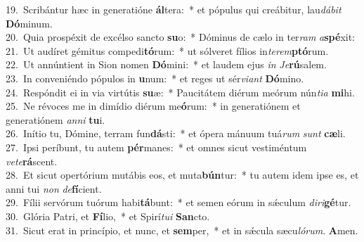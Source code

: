 {19.~}Scribántur hæc in generatióne \textbf{ál}tera:~* et pópulus qui creábitur, lau\textit{dá}\textit{bit} \textbf{Dó}minum.\\
{20.~}Quia prospéxit de excélso sancto \textbf{su}o:~* Dóminus de cælo in ter\textit{ram} \textit{a}\textbf{spé}xit:\\
{21.~}Ut audíret gémitus compedi\textbf{tó}rum:~* ut sólveret fílios in\textit{te}\textit{rem}\textbf{ptó}rum.\\
{22.~}Ut annúntient in Sion nomen \textbf{Dó}mini:~* et laudem ejus \textit{in} \textit{Je}\textbf{rú}salem.\\
{23.~}In conveniéndo pópulos in \textbf{u}num:~* et reges ut sér\textit{vi}\textit{ant} \textbf{Dó}mino.\\
{24.~}Respóndit ei in via virtútis \textbf{su}æ:~* Paucitátem diérum meórum nún\textit{ti}\textit{a} \textbf{mi}hi.\\
{25.~}Ne révoces me in dimídio diérum me\textbf{ó}rum:~* in generatiónem et generatiónem \textit{an}\textit{ni} \textbf{tu}i.\\
{26.~}Inítio tu, Dómine, terram fun\textbf{dá}sti:~* et ópera mánuum tuá\textit{rum} \textit{sunt} \textbf{cæ}li.\\
{27.~}Ipsi períbunt, tu autem \textbf{pér}manes:~* et omnes sicut vestiméntum \textit{ve}\textit{te}\textbf{rá}scent.\\
{28.~}Et sicut opertórium mutábis eos, et muta\textbf{bún}tur:~* tu autem idem ipse es, et anni tui \textit{non} \textit{de}\textbf{fí}cient.\\
{29.~}Fílii servórum tuórum habi\textbf{tá}bunt:~* et semen eórum in sǽculum \textit{di}\textit{ri}\textbf{gé}tur.\\
{30.~}Glória Patri, et \textbf{Fí}lio,~* et Spirí\textit{tu}\textit{i} \textbf{San}cto.\\
{31.~}Sicut erat in princípio, et nunc, et \textbf{sem}per,~* et in sǽcula sæcu\textit{ló}\textit{rum}. \textbf{A}men.\\
